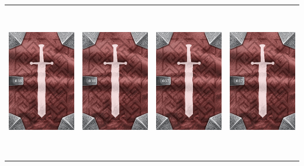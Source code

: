 \documentclass{minimal}
\begin{document}
{\begin{longtable}{llll}
\includegraphics[width=44mm,height=68mm]{./36-42/gh-038-heavy-basinet-back.png} &
\includegraphics[width=44mm,height=68mm]{./36-42/gh-038-heavy-basinet-back.png} &
\includegraphics[width=44mm,height=68mm]{./36-42/gh-037-robes-of-evocation-back.png} &
\includegraphics[width=44mm,height=68mm]{./36-42/gh-037-robes-of-evocation-back.png}\\ 

\end{longtable}}
\end{document}
